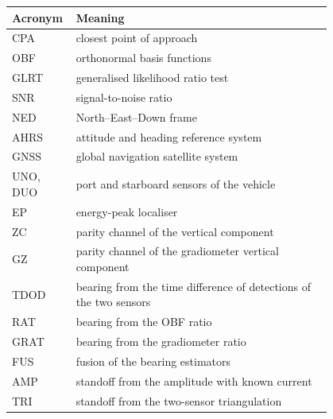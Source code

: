 \vspace{4pt}
\noindent
\begin{tabular}{@{}l >{\raggedright\arraybackslash}p{0.8\linewidth}@{}}
\toprule
Acronym & Meaning \\
\midrule
CPA & closest point of approach \\
OBF & orthonormal basis functions \\
GLRT & generalised likelihood ratio test \\
SNR & signal-to-noise ratio \\
NED & North--East--Down frame \\
AHRS & attitude and heading reference system \\
GNSS & global navigation satellite system \\
UNO, DUO & port and starboard sensors of the vehicle \\
EP & energy-peak localiser \\
ZC & parity channel of the vertical component \\
GZ & parity channel of the gradiometer vertical component \\
TDOD & bearing from the time difference of detections of the two sensors \\
RAT & bearing from the OBF ratio \\
GRAT & bearing from the gradiometer ratio \\
FUS & fusion of the bearing estimators \\
AMP & standoff from the amplitude with known current \\
TRI & standoff from the two-sensor triangulation \\
\bottomrule
\end{tabular}
